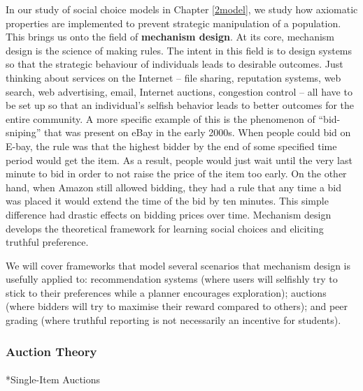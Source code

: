 \documentclass[
  letterpaper,
  numbers=noenddot,
  DIV=11]{scrreprt}
\makeatletter
\let\oldparagraph\paragraph
\renewcommand{\paragraph}{
    \@ifstar
      \xxxParagraphStar
      \xxxParagraphNoStar
  }
\newcommand{\xxxParagraphStar}[1]{\oldparagraph*{#1}\mbox{}}
\newcommand{\xxxParagraphNoStar}[1]{\oldparagraph{#1}\mbox{}}
\theoremstyle{definition}
\theoremstyle{plain}
\theoremstyle{plain}
\theoremstyle{remark}
\makeatother
\begin{document}
In our study of social choice models in Chapter
\hyperref[2human-decision-making-choice-models]{{[}2model{]}}, we study
how axiomatic properties are implemented to prevent strategic
manipulation of a population. This brings us onto the field of
\textbf{mechanism design}. At its core, mechanism design is the science
of making rules. The intent in this field is to design systems so that
the strategic behaviour of individuals leads to desirable outcomes. Just
thinking about services on the Internet -- file sharing, reputation
systems, web search, web advertising, email, Internet auctions,
congestion control -- all have to be set up so that an individual's
selfish behavior leads to better outcomes for the entire community. A
more specific example of this is the phenomenon of ``bid-sniping'' that
was present on eBay in the early 2000s. When people could bid on E-bay,
the rule was that the highest bidder by the end of some specified time
period would get the item. As a result, people would just wait until the
very last minute to bid in order to not raise the price of the item too
early. On the other hand, when Amazon still allowed bidding, they had a
rule that any time a bid was placed it would extend the time of the bid
by ten minutes. This simple difference had drastic effects on bidding
prices over time. Mechanism design develops the theoretical framework
for learning social choices and eliciting truthful preference.

We will cover frameworks that model several scenarios that mechanism
design is usefully applied to: recommendation systems (where users will
selfishly try to stick to their preferences while a planner encourages
exploration); auctions (where bidders will try to maximise their reward
compared to others); and peer grading (where truthful reporting is not
necessarily an incentive for students).

\subsubsection*{Auction Theory}\label{auction-theory}

\paragraph*{Single-Item Auctions}\label{single-item-auctions}
\end{document}

